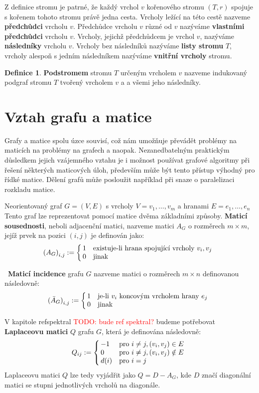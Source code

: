 \documentclass[11pt,american,czech,oneside]{book}
\theoremstyle{plain}
\theoremstyle{definition}
\newtheorem{definition}{Definice}
\newcommand{\TODO}[1]{\textcolor{red}{TODO: #1}}
\begin{document}
Z definice stromu je patrné, že každý vrchol $v$ kořenového stromu $(T,r)$ spojuje s kořenem tohoto stromu právě jedna cesta.
Vrcholy ležící na této cestě nazveme \textbf{předchůdci} vrcholu $v$. Předchůdce vrcholu $v$ různé od $v$ nazýváme \textbf{vlastními předchůdci} vrcholu $v$. Vrcholy, jejichž předchůdcem je vrchol $v$, nazýváme \textbf{následníky} vrcholu $v$. Vrcholy bez následníků nazýváme \textbf{listy stromu} $T$, vrcholy alespoň s jedním následníkem nazýváme \textbf{vnitřní vrcholy} stromu.

\begin{definition}
  \textbf{Podstromem} stromu $T$ určeným vrcholem $v$ nazveme indukovaný podgraf stromu $T$ tvořený vrcholem $v$ a a všemi jeho následníky.
\end{definition}

\section{Vztah grafu a matice}
\label{GrMatRel}
Grafy a matice spolu úzce souvisí, což nám umožňuje převádět problémy na maticích na problémy na grafech a naopak. Nezanedbatelným praktickým důsledkem jejich vzájemného vztahu je i možnost používat grafové algoritmy při řešení některých maticových úloh, především může být tento přístup výhodný pro řídké matice. Dělení grafů může posloužit například při snaze o paralelizaci rozkladu matice.

Neorientovaný graf $G=(V,E)$ s vrcholy $V = {v_1, \ldots, v_m}$ a hranami $E = {e_1, \ldots, e_n}$ Tento graf lze reprezentovat pomocí matice dvěma základními způsoby. \textbf{Maticí sousednosti}, neboli adjacenční matici, nazveme matici $A_G$ o rozměrech $m \times m$, jejíž prvek na pozici $(i,j)$ je definován jako:
\[
  {(A_G)}_{i,j} :=
  \left\{
    \begin{array}{@{\,}ll}
      1  & \mbox{existuje-li hrana spojující vrcholy $v_i, v_j$} \\
      0  & \mbox{jinak}
    \end{array}
  \right.
\]

 \textbf{Maticí incidence} grafu $G$ nazveme matici o rozměrech $m \times n$  definovanou následovně:
\[
  {(\bar{A}_G)}_{i,j} :=
  \left\{
	  \begin{array}{@{\,}ll}
		  1  & \mbox{je-li $v_i$ koncovým vrcholem hrany $e_j$} \\
		  0  & \mbox{jinak}
	  \end{array}
  \right.
\]

V kapitole ref{spektral} \TODO{bude ref spektral?} budeme potřebovat \textbf{Laplaceovu matici} $Q$ grafu $G$, která je definována následovně:
\[
Q_{ij} :=
\left\{
	\begin{array}{@{\,}ll}
		-1  & \mbox{pro } i \neq j, (v_i,v_j) \in E \\
		0 & \mbox{pro } i \neq j, (v_i,v_j) \notin E\\
        d(i) & \mbox{pro } i = j
	\end{array}
\right.
\]
Laplaceovu matici $Q$ lze tedy vyjádřit jako $Q = D - A_G$, kde $D$  značí diagonální matici se stupni jednotlivých vrcholů na diagonále.
\end{document}
